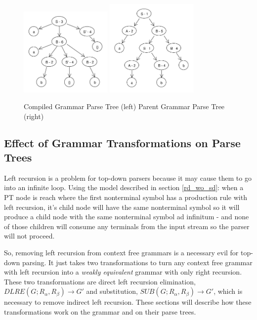 \documentclass[11pt]{article}
\begin{document}
\begin{figure}[h!]
    \centering
    \includegraphics[width=0.4\textwidth,natwidth=458,natheight=444]{umlet/compiled_ex.pdf}
    \includegraphics[width=0.4\textwidth,natwidth=472,natheight=500]{umlet/decompiled_ex.pdf}
    \caption{Compiled Grammar Parse Tree (left) Parent Grammar Parse Tree (right)}
    \label{fig:comp_to_dec_ex}
\end{figure}

\subsection{Effect of Grammar Transformations on Parse Trees}
\label{gram_transforms}
Left recursion is a problem for top-down parsers because it may cause them to
go into an infinite loop. Using the model described in section \ref{rd_wo_sd}:
when a PT node is reach where the first nonterminal symbol has a production rule with
left recursion, it's child node will have the same nonterminal symbol so it will produce
a child node with the same nonterminal symbol ad infinitum - and none of those children will
consume any terminals from the input stream so the parser will not proceed. 

So, removing left recursion from context free grammars is a necessary evil for top-down parsing.
It just takes two transformations to turn any context free grammar with left recursion
into a {\em weakly equivalent} grammar with only right recursion.
These two transformations are direct left recursion elimination, 
$DLRE(G; R_\alpha, R_\beta) \rightarrow G'$ and substitution, 
$SUB(G; R_\alpha, R_\beta) \rightarrow G'$, which is necessary to
remove indirect left recursion. \cite{aho, lewis}
These sections will describe how these transformations work on the grammar
and on their parse trees.
\end{document}

